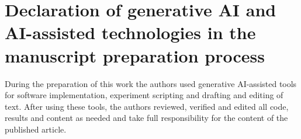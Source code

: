 \documentclass[final,5p,times,twocolumn]{elsarticle}
\theoremstyle{definition}
\begin{document}
\section*{Declaration of generative AI and AI-assisted technologies in the manuscript preparation process}
During the preparation of this work the authors used generative AI-assisted tools for software implementation, experiment scripting and drafting and editing of text. After using these tools, the authors reviewed, verified and edited all code, results and content as needed and take full responsibility for the content of the published article.



\end{document}
